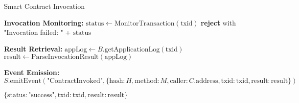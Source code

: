 \begin{tcolorbox}
\begin{protocol}{Smart Contract Invocation}
\begin{algorithmic}[1]
\State \textbf{Invocation Monitoring:}
\State $\text{status} \gets \text{MonitorTransaction}(\text{txid})$
    \State \textbf{reject} with "Invocation failed: " + $\text{status}$
\EndIf

\State \textbf{Result Retrieval:}
\State $\text{appLog} \gets B.\text{getApplicationLog}(\text{txid})$
\State $\text{result} \gets \text{ParseInvocationResult}(\text{appLog})$

\State \textbf{Event Emission:}
\State $S.\text{emitEvent}(\text{"ContractInvoked"}, \{\text{hash}: H, \text{method}: M, \text{caller}: C.\text{address}, \text{txid}: \text{txid}, \text{result}: \text{result}\})$

\State \Return $\{\text{status}: \text{"success"}, \text{txid}: \text{txid}, \text{result}: \text{result}\}$
\end{algorithmic}
\end{protocol}
\end{tcolorbox}
